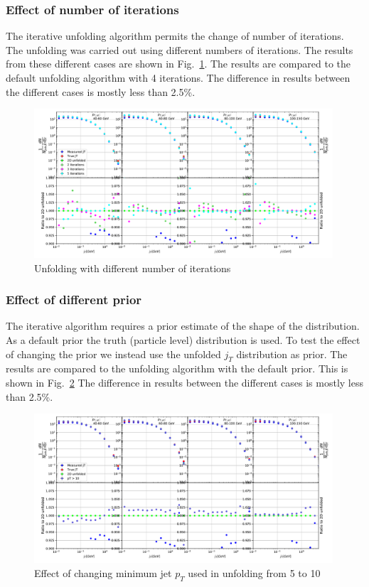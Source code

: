 \subsubsection{Effect of number of iterations}
\label{sec:iterations}
The iterative unfolding algorithm permits the change of number of iterations. The unfolding was carried out using different numbers of iterations. The results from these different cases are shown in Fig.~\ref{fig:iterations}. The results are compared to the default unfolding algorithm with 4 iterations. The difference in results between the different cases is mostly less than 2.5\%.
\begin{figure}
\includegraphics[width=0.99\textwidth]{figures/systematics/IterationsComparison.pdf}
\caption{Unfolding with different number of iterations}
\label{fig:iterations}
\end{figure}

\subsubsection{Effect of different prior}
\label{sec:prior}
The iterative algorithm requires a prior estimate of the shape of the distribution. As a default prior the truth (particle level) distribution is used. To test the effect of changing the prior we instead use the unfolded $j_T$ distribution as prior. The results are compared to the unfolding algorithm with the default prior. This is shown in Fig.~\ref{fig:prior} The difference in results between the different cases is mostly less than 2.5\%. 
\begin{figure}
\includegraphics[width=0.99\textwidth]{figures/systematics/PtCutComparison10.pdf}
\caption{Effect of changing minimum jet $p_T$ used in unfolding from 5 to 10 \gev}
\label{fig:prior}
\end{figure}

